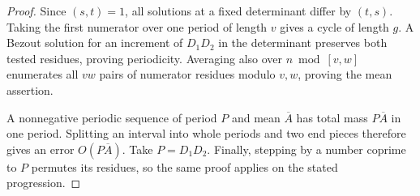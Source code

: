 \begin{proof}
Since $(s,t)=1$, all solutions at a fixed determinant differ by $(t,s)$.
Taking the first numerator over one period of length $v$ gives a cycle of
length $g$. A Bezout solution for an increment of $D_1D_2$ in the
determinant preserves both tested residues, proving periodicity. Averaging
also over $n\bmod[v,w]$ enumerates all $vw$ pairs of numerator residues
modulo $v,w$, proving the mean assertion.

A nonnegative periodic sequence of period $P$ and mean $\overline A$ has
total mass $P\overline A$ in one period. Splitting an interval into whole
periods and two end pieces therefore gives an error $O(P\overline A)$.
Take $P=D_1D_2$. Finally, stepping by a number coprime to $P$ permutes its
residues, so the same proof applies on the stated progression.
\end{proof}
